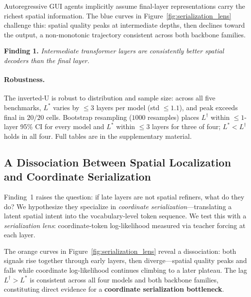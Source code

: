 Autoregressive GUI agents implicitly assume final-layer representations carry the richest spatial information.
The blue curves in Figure~\ref{fig:serialization_lens} challenge this: spatial quality peaks at intermediate depths, then declines toward the output, a non-monotonic trajectory consistent across both backbone families.

\begin{tcolorbox}[colback=gray!8, colframe=gray!40, boxrule=0.4pt, arc=2pt, left=4pt, right=4pt, top=3pt, bottom=3pt]
\textbf{Finding 1.}
\emph{Intermediate transformer layers are consistently better spatial decoders than the final layer.}
\end{tcolorbox}

\paragraph{Robustness.}
The inverted-U is robust to distribution and sample size: across all five benchmarks, $L^*$ varies by $\le 3$ layers per model (std $\le 1.1$), and peak exceeds final in $20/20$ cells.
Bootstrap resampling ($1000$ resamples) places $L^\dagger$ within $\le 1$-layer 95\% CI for every model and $L^*$ within $\le 3$ layers for three of four; $L^* < L^\dagger$ holds in all four.
Full tables are in the supplementary material.

\subsection{A Dissociation Between Spatial Localization and Coordinate Serialization}
\label{sec:analysis:serialization}

Finding~1 raises the question: if late layers are not spatial refiners, what do they do?
We hypothesize they specialize in \emph{coordinate serialization}---translating a latent spatial intent into the vocabulary-level token sequence.
We test this with a \emph{serialization lens}: coordinate-token log-likelihood measured via teacher forcing at each layer.

The orange curves in Figure~\ref{fig:serialization_lens} reveal a dissociation: both signals rise together through early layers, then diverge---spatial quality peaks and falls while coordinate log-likelihood continues climbing to a later plateau.
The lag $L^\dagger > L^*$ is consistent across all four models and both backbone families, constituting direct evidence for a \textbf{coordinate serialization bottleneck}.


